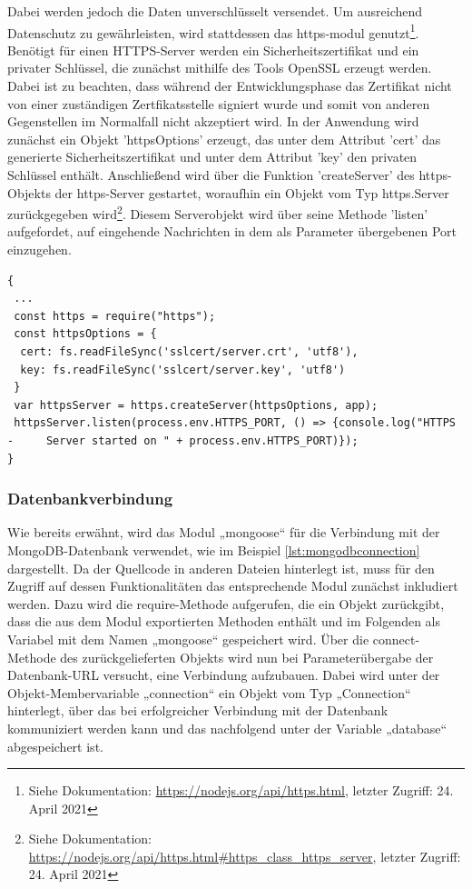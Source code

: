 \noindent
Dabei werden jedoch die Daten unverschlüsselt versendet. Um ausreichend Datenschutz zu gewährleisten, wird stattdessen das https-modul genutzt\footnote{Siehe Dokumentation: \url{https://nodejs.org/api/https.html}, letzter Zugriff: 24. April 2021}.
\newline
Benötigt für einen HTTPS-Server werden ein Sicherheitszertifikat und ein privater Schlüssel, die zunächst mithilfe des Tools OpenSSL erzeugt werden.  
Dabei ist zu beachten, dass während der Entwicklungsphase das Zertifikat nicht von einer zuständigen Zertfikatsstelle signiert wurde und somit von anderen Gegenstellen im Normalfall nicht akzeptiert wird.
\newline
In der Anwendung wird zunächst ein Objekt 'httpsOptions' erzeugt, das unter dem Attribut 'cert' das generierte Sicherheitszertifikat und unter dem Attribut 'key' den privaten Schlüssel enthält. Anschließend wird über die Funktion 'createServer' des https-Objekts der https-Server gestartet, woraufhin ein Objekt vom Typ https.Server zurückgegeben wird\footnote{Siehe Dokumentation:  \url{https://nodejs.org/api/https.html\#https_class_https_server}, letzter Zugriff: 24. April 2021}. 
Diesem Serverobjekt wird über seine Methode 'listen' aufgefordet, auf eingehende Nachrichten in dem als Parameter übergebenen Port einzugehen.\\

\begin{lstlisting}[caption=Gesicherte Verbindung, label=lst:nodejs_safeconnection]
{
 ...
 const https = require("https");
 const httpsOptions = {
  cert: fs.readFileSync('sslcert/server.crt', 'utf8'),
  key: fs.readFileSync('sslcert/server.key', 'utf8')
 }
 var httpsServer = https.createServer(httpsOptions, app);
 httpsServer.listen(process.env.HTTPS_PORT, () => {console.log("HTTPS - 	Server started on " + process.env.HTTPS_PORT)});
}
\end{lstlisting}


\subsubsection{Datenbankverbindung}
Wie bereits erwähnt, wird das Modul „mongoose“ für die Verbindung mit der MongoDB-Datenbank verwendet, wie im Beispiel \ref{lst:mongodbconnection} dargestellt.
Da der Quellcode in anderen Dateien hinterlegt ist, muss für den Zugriff auf dessen Funktionalitäten das entsprechende Modul zunächst inkludiert werden. Dazu wird die require-Methode aufgerufen, die ein Objekt zurückgibt, dass die aus dem Modul exportierten Methoden enthält und im Folgenden als Variabel mit dem Namen „mongoose“ gespeichert wird. 
\newline
Über die connect-Methode des zurückgelieferten Objekts wird nun bei Parameterübergabe der Datenbank-URL versucht, eine Verbindung aufzubauen.  
Dabei wird unter der Objekt-Membervariable  „connection“ ein Objekt vom Typ „Connection“ hinterlegt, über das bei erfolgreicher Verbindung mit der Datenbank kommuniziert werden kann und das nachfolgend unter der Variable „database“ abgespeichert ist.\\

